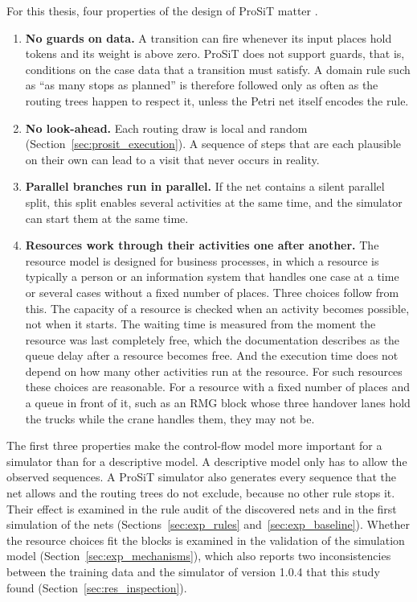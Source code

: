 For this thesis, four properties of the design of ProSiT matter
\cite{Vinci2026prosit,ProSiTRepository}.
\begin{enumerate}[itemsep=2pt,topsep=4pt]
\item \textbf{No guards on data.} A transition can fire whenever its input places
hold tokens and its weight is above zero. ProSiT does not support guards, that is,
conditions on the case data that a transition must satisfy. A domain rule such as
``as many stops as planned'' is therefore followed only as often as the routing
trees happen to respect it, unless the Petri net itself encodes the rule.
\item \textbf{No look-ahead.} Each routing draw is local and random
(Section~\ref{sec:prosit_execution}). A sequence of steps that are each plausible
on their own can lead to a visit that never occurs in reality.
\item \textbf{Parallel branches run in parallel.} If the net contains a silent
parallel split, this split enables several activities at the same time, and the
simulator can start them at the same time.
\item \textbf{Resources work through their activities one after another.} The
resource model is designed for business processes, in which a resource is
typically a person or an information system that handles one case at a time or
several cases without a fixed number of places. Three choices follow from this. The
capacity of a resource is checked when an activity becomes possible, not when it
starts. The waiting time is measured from the moment the resource was last
completely free, which the documentation describes as the queue delay after a
resource becomes free. And the execution time does not depend on how many other
activities run at the resource. For such resources these choices are reasonable.
For a resource with a fixed number of places and a queue in front of it, such as an
RMG block whose three handover lanes hold the trucks while the crane handles them,
they may not be.
\end{enumerate}
The first three properties make the control-flow model more important for a
simulator than for a descriptive model. A descriptive model only has to allow the
observed sequences. A ProSiT simulator also generates every sequence that the net
allows and the routing trees do not exclude, because no other rule stops it. Their
effect is examined in the rule audit of the discovered nets and in the first
simulation of the nets (Sections~\ref{sec:exp_rules} and~\ref{sec:exp_baseline}).
Whether the resource choices fit the blocks is examined in the validation of the
simulation model (Section~\ref{sec:exp_mechanisms}), which also reports two
inconsistencies between the training data and the simulator of version 1.0.4 that
this study found (Section~\ref{sec:res_inspection}).

